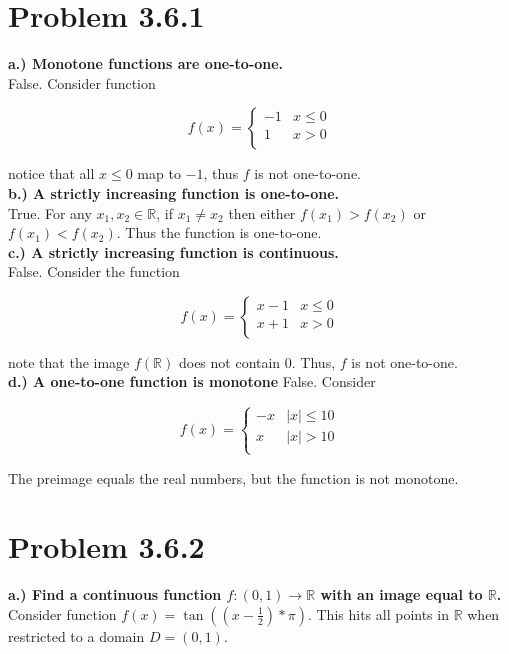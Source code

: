 \documentclass[10pt]{article} %
\begin{document}
\section{Problem 3.6.1}
\textbf{a.) Monotone functions are one-to-one.}\\
False. Consider function

\[
f(x) =
\begin{cases} 
      -1 & x\leq 0 \\
      1  & x > 0 \\
   \end{cases}
\]

notice that all $x\leq0$ map to $-1$, thus $f$ is not one-to-one.\\

\textbf{b.) A strictly increasing function is one-to-one.}\\
True. For any $x_1, x_2 \in \mathbb{R}$, if $x_1 \neq x_2$ then either $f(x_1) > f(x_2)$ or $f(x_1) < f(x_2)$. Thus the function is one-to-one.\\

\textbf{c.) A strictly increasing function is continuous.}\\
False. Consider the function 

\[
f(x) =
\begin{cases} 
      x-1 & x\leq 0 \\
      x+1  & x > 0 \\
   \end{cases}
\]

note that the image $f(\mathbb{R})$ does not contain 0. Thus, $f$ is not one-to-one.\\

\textbf{d.) A one-to-one function is monotone}
False. Consider

\[
f(x) =
\begin{cases} 
      -x & |x|\leq 10 \\
      x  & |x| > 10 \\
   \end{cases}
\]

The preimage equals the real numbers, but the function is not monotone.\\

\section{Problem 3.6.2}
\textbf{a.) Find a continuous function $f:(0,1)\rightarrow\mathbb{R}$ with an image equal to $\mathbb{R}$.}\\
Consider function $f(x) = \tan((x-\frac{1}{2})*\pi)$. This hits all points in $\mathbb{R}$ when restricted to a domain $D = (0,1)$.\\
\end{document}
